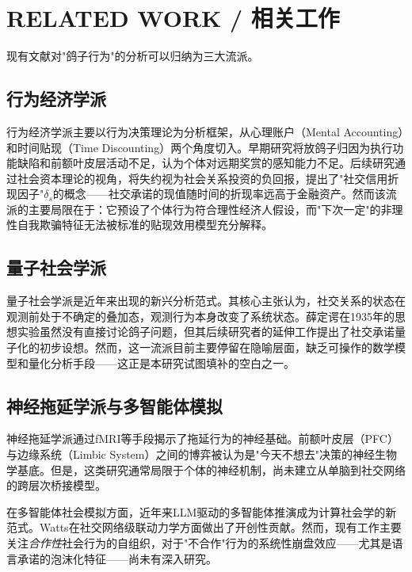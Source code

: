 \documentclass[journal]{IEEEtran}
\newcommand{\citet}[1]{\cite{#1}}
\begin{document}
\section{RELATED WORK / 相关工作}

现有文献对"鸽子行为"的分析可以归纳为三大流派。

\subsection{行为经济学派}

行为经济学派主要以行为决策理论为分析框架，从心理账户（Mental Accounting）和时间贴现（Time Discounting）两个角度切入。早期研究\citet{procrastination}将放鸽子归因为执行功能缺陷和前额叶皮层活动不足，认为个体对远期奖赏的感知能力不足。后续研究\citet{social_capital}通过社会资本理论的视角，将失约视为社会关系投资的负回报，提出了"社交信用折现因子"$\delta_s$的概念——社交承诺的现值随时间的折现率远高于金融资产。然而该流派的主要局限在于：它预设了个体行为符合理性经济人假设，而"下次一定"的非理性自我欺骗特征无法被标准的贴现效用模型充分解释。

\subsection{量子社会学派}

量子社会学派是近年来出现的新兴分析范式。其核心主张认为，社交关系的状态在观测前处于不确定的叠加态，观测行为本身改变了系统状态。薛定谔在1935年的思想实验\citet{schrodinger_vs_pigeon}虽然没有直接讨论鸽子问题，但其后续研究者的延伸工作\citet{quantum_social}提出了社交承诺量子化的初步设想。然而，这一流派目前主要停留在隐喻层面，缺乏可操作的数学模型和量化分析手段——这正是本研究试图填补的空白之一。

\subsection{神经拖延学派与多智能体模拟}

神经拖延学派通过fMRI等手段揭示了拖延行为的神经基础\citet{procrastination}。前额叶皮层（PFC）与边缘系统（Limbic System）之间的博弈被认为是"今天不想去"决策的神经生物学基底。但是，这类研究通常局限于个体的神经机制，尚未建立从单脑到社交网络的跨层次桥接模型。

在多智能体社会模拟方面，近年来LLM驱动的多智能体推演成为计算社会学的新范式\citet{generative_agents}\citet{social_learning}。Watts\citet{network_collapse}在社交网络级联动力学方面做出了开创性贡献。然而，现有工作主要关注\textit{合作性}社会行为的自组织，对于"不合作"行为的系统性崩盘效应——尤其是语言承诺的泡沫化特征——尚未有深入研究。
\end{document}
